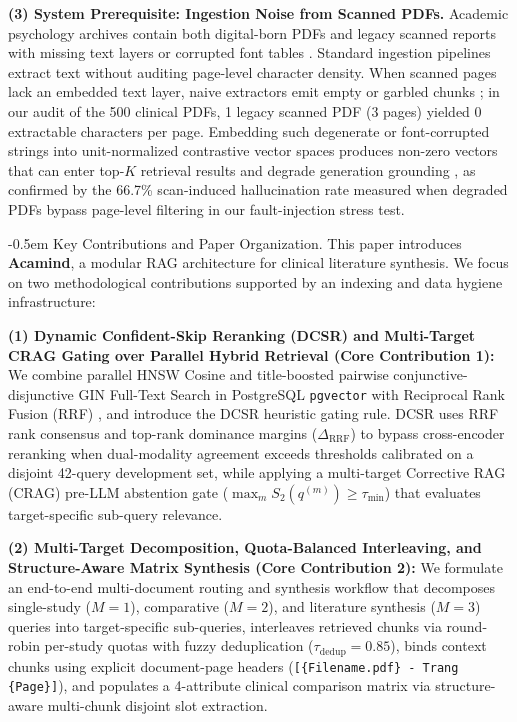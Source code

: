 \documentclass[10pt]{SPIIRAS_Proceedings}
\makeatletter
\renewcommand\subsection{\@startsection{subsection}{2}{\parindent}%
  {\z@}%
  {-0.5em}%
  {\normalfont\normalsize\bfseries}}
\makeatother
\begin{document}
\textbf{(3) System Prerequisite: Ingestion Noise from Scanned PDFs.} Academic psychology archives contain both digital-born PDFs and legacy scanned reports with missing text layers or corrupted font tables \cite{lo2020s2orc}. Standard ingestion pipelines \cite{gao2023retrieval} extract text without auditing page-level character density. When scanned pages lack an embedded text layer, naive extractors emit empty or garbled chunks \cite{lo2020s2orc}; in our audit of the 500 clinical PDFs, 1 legacy scanned PDF (3 pages) yielded 0 extractable characters per page. Embedding such degenerate or font-corrupted strings into unit-normalized contrastive vector spaces \cite{wang2022text} produces non-zero vectors that can enter top-$K$ retrieval results and degrade generation grounding \cite{yan2024corrective}, as confirmed by the 66.7\% scan-induced hallucination rate measured when degraded PDFs bypass page-level filtering in our fault-injection stress test.

\subsection{Key Contributions and Paper Organization.} This paper introduces \textbf{Acamind}, a modular RAG architecture for clinical literature synthesis. We focus on two methodological contributions supported by an indexing and data hygiene infrastructure:

\textbf{(1) Dynamic Confident-Skip Reranking (DCSR) and Multi-Target CRAG Gating over Parallel Hybrid Retrieval (Core Contribution 1):} We combine parallel HNSW Cosine and title-boosted pairwise conjunctive-disjunctive GIN Full-Text Search in PostgreSQL \texttt{pgvector} with Reciprocal Rank Fusion (RRF) \cite{cormack2009reciprocal}, and introduce the DCSR heuristic gating rule. DCSR uses RRF rank consensus and top-rank dominance margins ($\Delta_{\mathrm{RRF}}$) to bypass cross-encoder reranking when dual-modality agreement exceeds thresholds calibrated on a disjoint 42-query development set, while applying a multi-target Corrective RAG (CRAG) \cite{yan2024corrective} pre-LLM abstention gate ($\max_{m} S_2(q^{(m)}) \ge \tau_{\min}$) that evaluates target-specific sub-query relevance.

\textbf{(2) Multi-Target Decomposition, Quota-Balanced Interleaving, and Structure-Aware Matrix Synthesis (Core Contribution 2):} We formulate an end-to-end multi-document routing and synthesis workflow \cite{gao2024modular,skarlinski2024language} that decomposes single-study ($M=1$), comparative ($M=2$), and literature synthesis ($M=3$) queries into target-specific sub-queries, interleaves retrieved chunks via round-robin per-study quotas with fuzzy deduplication ($\tau_{\mathrm{dedup}} = 0.85$), binds context chunks using explicit document-page headers (\texttt{[\{Filename.pdf\} - Trang \{Page\}]}), and populates a 4-attribute clinical comparison matrix via structure-aware multi-chunk disjoint slot extraction.
\end{document}

